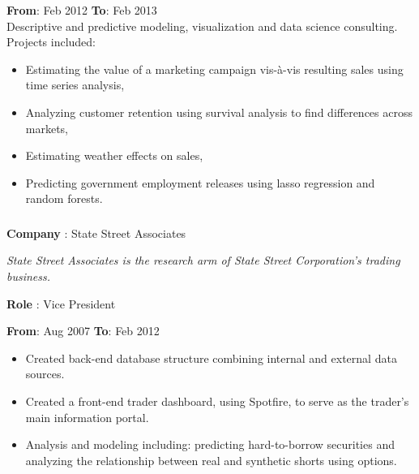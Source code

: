 \documentclass[
]{article}
\providecommand{\tightlist}{%
  \setlength{\itemsep}{0pt}\setlength{\parskip}{0pt}}
\begin{document}
{{\textbf{From}: Feb 2012 \hspace{0.5in}  \textbf{To}: Feb 2013\\
Descriptive and predictive modeling, visualization and data science
consulting. Projects included:

\begin{itemize}
\tightlist
\item
  Estimating the value of a marketing campaign vis-à-vis resulting sales
  using time series analysis,
\item
  Analyzing customer retention using survival analysis to find
  differences across markets,
\item
  Estimating weather effects on sales,
\item
  Predicting government employment releases using lasso regression and
  random forests.
\end{itemize}

\hypertarget{ssa}{%
\subsubsection{}\label{ssa}}
\begin{flushleft}
\textbf{Company} : State Street Associates
\end{flushleft}

{\hspace{0.1in} \footnotesize \emph{State Street Associates is the research arm of State Street Corporation's trading business.}}


\begin{flushleft}
\textbf{Role} : Vice President
\end{flushleft}

\textbf{From}: Aug 2007 \hspace{0.5in}  \textbf{To}: Feb 2012 \\

 

  \begin{itemize}
  \tightlist
  \item
    Created back-end database structure combining internal and external
    data sources.
  \item
    Created a front-end trader dashboard, using Spotfire, to serve as
    the trader's main information portal.
  \item
    Analysis and modeling including: predicting hard-to-borrow
    securities and analyzing the relationship between real and synthetic
    shorts using options.


\end{itemize}}}
\end{document}
